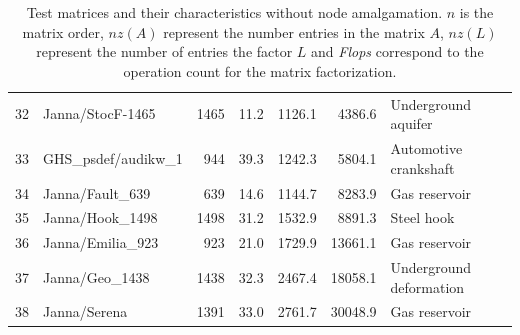 \documentclass{article}
\begin{document}
\begin{table}[htbp]
\begin{center}
{\begin{tabular}{rl|rrrrl}
      32 & Janna/StocF-1465                & 1465     & 11.2     & 1126.1   & 4386.6   & Underground aquifer      \\
      33 & GHS\_psdef/audikw\_1            & 944      & 39.3     & 1242.3   & 5804.1   & Automotive crankshaft    \\
      34 & Janna/Fault\_639                & 639      & 14.6     & 1144.7   & 8283.9   & Gas reservoir            \\
      35 & Janna/Hook\_1498                & 1498     & 31.2     & 1532.9   & 8891.3   & Steel hook               \\
      36 & Janna/Emilia\_923               & 923      & 21.0     & 1729.9   & 13661.1  & Gas reservoir            \\
      37 & Janna/Geo\_1438                 & 1438     & 32.3     & 2467.4   & 18058.1  & Underground deformation  \\
      38 & Janna/Serena                    & 1391     & 33.0     & 2761.7   & 30048.9  & Gas reservoir            \\
      \hline
    \end{tabular}}
  \end{center}
  \caption{Test matrices and their characteristics without node
    amalgamation. $n$ is the matrix order, $nz(A)$ represent the
    number entries in the matrix $A$, $nz(L)$ represent the number of
    entries the factor $L$ and \textit{Flops} correspond to the operation
    count for the matrix factorization.}
\end{table}

\end{document}
